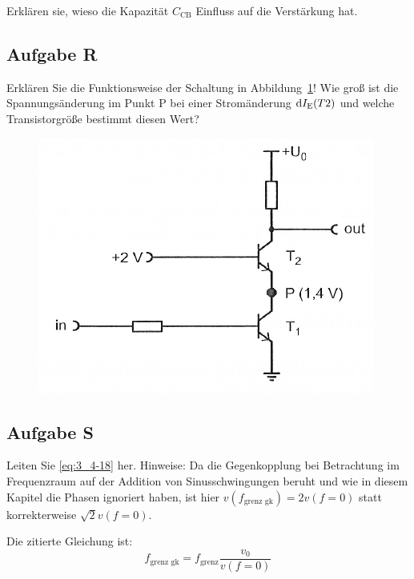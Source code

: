 \begin{problem}
	Erklären sie, wieso die Kapazität $C_\text{CB}$ Einfluss auf die
	Verstärkung hat.
\end{problem}

\fehlt

\FloatBarrier
\subsection{Aufgabe R}

\begin{problem}
	Erklären Sie die Funktionsweise der Schaltung in
	Abbildung~\ref{fig:3_4-15}! Wie groß ist die Spannungsänderung im Punkt P
	bei einer Stromänderung $\mathrm d I_\text E(T2)$ und welche
	Transistorgröße bestimmt diesen Wert?
\end{problem}

\begin{figure}[htbp]
	\centering
	\includegraphics[width=.6\textwidth]{Anleitung/3_4-15.png}
	\caption{%
		\cite[Abbildung~3/4.15]{physik313-Anleitung}
	}
	\label{fig:3_4-15}
\end{figure}

\fehlt

\FloatBarrier
\subsection{Aufgabe S}

\begin{problem}
	Leiten Sie \eqref{eq:3_4-18} her. Hinweise: Da die Gegenkopplung bei
	Betrachtung im Frequenzraum auf der Addition von Sinusschwingungen beruht
	und wie in diesem Kapitel die Phasen ignoriert haben, ist hier
	$v(f_\text{grenz gk}) = 2v(f=0)$ statt korrekterweise $\sqrt 2 v (f = 0)$.
\end{problem}

Die zitierte Gleichung ist:
\begin{equation}
	\label{eq:3_4-18}
	f_\text{grenz gk} = f_\text{grenz} \frac{v_0}{v(f=0)}
\end{equation}

